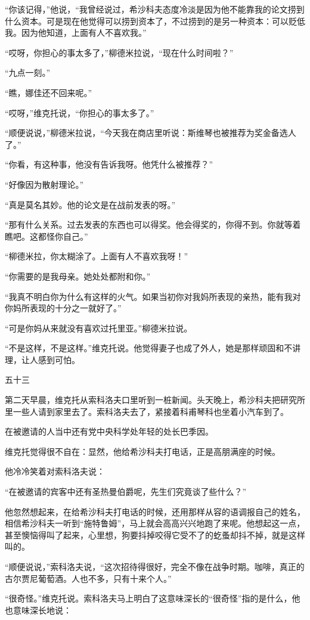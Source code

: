 “你该记得，”他说，“我曾经说过，希沙科夫态度冷淡是因为他不能靠我的论文捞到什么资本。可是现在他觉得可以捞到资本了，不过捞到的是另一种资本：可以贬低我。因为他知道，上面有人不喜欢我。”

“哎呀，你担心的事太多了，”柳德米拉说，“现在什么时间啦？”

“九点一刻。”

“瞧，娜佳还不回来呢。”

“哎呀，”维克托说，“你担心的事太多了。”

“顺便说说，”柳德米拉说，“今天我在商店里听说：斯维琴也被推荐为奖金备选人了。”

“你看，有这种事，他没有告诉我呀。他凭什么被推荐？”

“好像因为散射理论。”

“真是莫名其妙。他的论文是在战前发表的呀。”

“那有什么关系。过去发表的东西也可以得奖。他会得奖的，你得不到。你就等着瞧吧。这都怪你自己。”

“柳德米拉，你太糊涂了。上面有人不喜欢我呀！”

“你需要的是我母亲。她处处都附和你。”

“我真不明白你为什么有这样的火气。如果当初你对我妈所表现的亲热，能有我对你妈所表现的十分之一就好了。”

“可是你妈从来就没有喜欢过托里亚。”柳德米拉说。

“不是这样，不是这样。”维克托说。他觉得妻子也成了外人，她是那样顽固和不讲理，让人感到可怕。

五十三

第二天早晨，维克托从索科洛夫口里听到一桩新闻。头天晚上，希沙科夫把研究所里一些人请到家里去了。索科洛夫去了，紧接着科甫琴科也坐着小汽车到了。

在被邀请的人当中还有党中央科学处年轻的处长巴季因。

维克托觉得很不自在：显然，他给希沙科夫打电话，正是高朋满座的时候。

他冷冷笑着对索科洛夫说：

“在被邀请的宾客中还有圣热曼伯爵呢，先生们究竟谈了些什么？”

他忽然想起来，在给希沙科夫打电话的时候，还用那样从容的语调报自己的姓名，相信希沙科夫一听到“施特鲁姆”，马上就会高高兴兴地跑了来呢。他想起这一点，甚至懊恼得叫了起来，心里想，狗要抖掉咬得它受不了的虼蚤却抖不掉，就是这样叫的。

“顺便说说，”索科洛夫说，“这次招待得很好，完全不像在战争时期。咖啡，真正的古尔贾尼葡萄酒。人也不多，只有十来个人。”

“很奇怪。”维克托说。索科洛夫马上明白了这意味深长的“很奇怪”指的是什么，他也意味深长地说：

